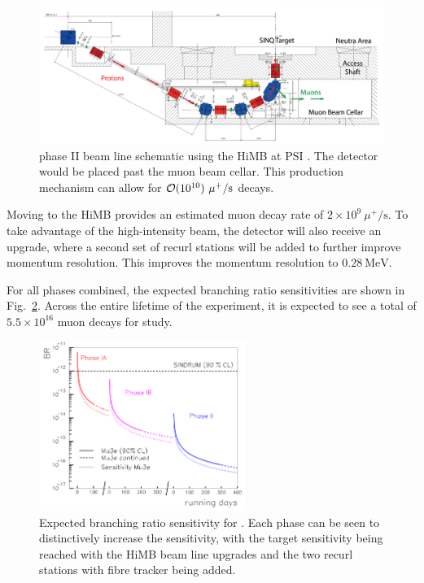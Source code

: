 \begin{figure}[h]
    \centering
    \includegraphics[width = \textwidth]{Figures/experiments/mu3e_phase2_schematic.png}
    \caption[\mueee phase II beam line schematic using the HiMB at PSI.]{\mueee phase II beam line schematic using the HiMB at PSI \cite{Blondel:2013ia}.
    The \mueee detector would be placed past the muon beam cellar.
    This production mechanism can allow for $\operatorname{\mathcal{O}}(10^{10})~\mu^+/\textrm{s}$ decays.}
    \label{fig:mu3e_phaseII_schematic}
\end{figure}

Moving to the HiMB provides an estimated muon decay rate of $2 \times 10^9~\mu^+/\textrm{s}$.
To take advantage of the high-intensity beam, the detector will also receive an upgrade, where a second set of recurl stations will be added to further improve momentum resolution.
This improves the momentum resolution to $0.28~\textrm{MeV}$.

For all phases combined, the expected branching ratio sensitivities are shown in Fig.~\ref{fig:mu3e_br_limits}.
Across the entire lifetime of the experiment, it is expected to see a total of $5.5 \times 10^{16}$ muon decays for study.

\begin{figure}[h]
    \centering
    \includegraphics[width = 0.6\textwidth]{Figures/experiments/mu3e_br_limits.png}
    \caption[Expected branching ratio sensitivity for \mueee.]{Expected branching ratio sensitivity for \mueee \cite{Blondel:2013ia}.
    Each phase can be seen to distinctively increase the sensitivity, with the target sensitivity being reached with the HiMB beam line upgrades and the two recurl stations with fibre tracker being added.}
    \label{fig:mu3e_br_limits}
\end{figure}
